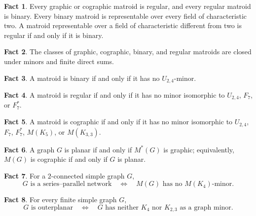 \documentclass[12pt,a4paper]{article}
\numberwithin{equation}{section}
\theoremstyle{definition}
\newtheorem{fact}{Fact}[section]
\theoremstyle{remark}
\begin{document}
\begin{fact}\label{fact:matroid-classes}
Every graphic or cographic matroid is regular, and every regular
matroid is binary.  Every binary matroid is representable over every
field of characteristic two.  A matroid representable over a field
of characteristic different from two is regular if and only if it is
binary.
\end{fact}

\begin{fact}\label{fact:minor-direct-sums}
The classes of graphic, cographic, binary, and regular matroids
are closed under minors and finite direct sums.
\end{fact}

\begin{fact}\label{fact:binary-excluded}
A matroid is binary if and only if it has no \(U_{2,4}\)-minor.
\end{fact}

\begin{fact}\label{fact:regular-excluded}
A matroid is regular if and only if it has no minor isomorphic to
\(U_{2,4}\), \(F_7\), or \(F_7^*\).
\end{fact}

\begin{fact}\label{fact:cographic-excluded}
A matroid is cographic if and only if it has no minor isomorphic to
\(U_{2,4}\), \(F_7\), \(F_7^*\), \(M(K_5)\), or \(M(K_{3,3})\).
\end{fact}

\begin{fact}\label{fact:whitney-planarity}
A graph \(G\) is planar if and only if \(M^*(G)\) is graphic;
equivalently, \(M(G)\) is cographic if and only if \(G\) is planar.
\end{fact}

\begin{fact}\label{fact:series-parallel-minors}
For a \(2\)-connected simple graph \(G\),
\[
G\text{ is a series--parallel network}
 \quad\Longleftrightarrow\quad
 M(G)\text{ has no }M(K_4)\text{-minor}.
\]
\end{fact}

\begin{fact}\label{fact:outerplanar-minors}
For every finite simple graph \(G\),
\[
G\text{ is outerplanar}
 \quad\Longleftrightarrow\quad
 G\text{ has neither }K_4\text{ nor }K_{2,3}\text{ as a graph minor}.
\]
\end{fact}
\end{document}
